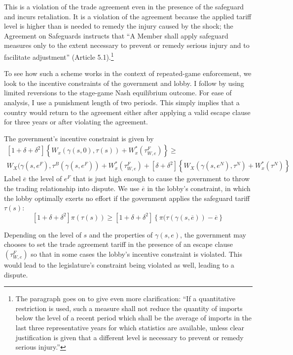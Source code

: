 \documentclass[12pt]{article}
\newcommand{\ov}{\overline}
\newcommand{\ga}{\gamma}
\newcommand{\de}{\delta}
\begin{document}
This is a violation of the trade agreement even in the presence of the safeguard and incurs retaliation. It is a violation of the agreement because the applied tariff level is higher than is needed to remedy the injury caused by the shock; the Agreement on Safeguards instructs that ``A Member shall apply safeguard measures only to the extent necessary to prevent or remedy serious injury and to facilitate adjustment'' (Article 5.1).\footnote{The paragraph goes on to give even more clarification: ``If a quantitative restriction is used, such a measure shall  not reduce the quantity of imports below the level of a recent period which shall be the average of imports in the last three representative years for which statistics are available, unless clear justification is given that a different level is necessary to prevent or remedy serious injury.''}

To see how such a scheme works in the context of repeated-game enforcement, we look to the incentive constraints of the government and lobby. I follow \Textcite{buzard2013a} by using limited reversions to the stage-game Nash equilibrium outcome. For ease of analysis, I use a punishment length of two periods. This simply implies that a country would return to the agreement either after applying a valid escape clause for three years or after violating the agreement.

The government's incentive constraint is given by
  \begin{multline}
    \left[1+ \de +\de^2 \right] \left\{W_x(\ga(s,0),\tau(s)) + W_x^*(\tau^F_{W,e}) \right\} \geq \\ W_X(\ga(s,e^F),\tau^B(\ga(s,e^F)) + W_x^*(\tau^F_{W,e}) + \left[\de +\de^2 \right] \left\{W_X(\ga(s,e^N),\tau^N) + W_x^*(\tau^N) \right\}
		\label{exp:govincentEC}
  \end{multline}
Label $\ov{e}$ the level of $e^F$ that is just high enough to cause the government to throw the trading relationship into dispute. We use $\ov{e}$ in the lobby's constraint, in which the lobby optimally exerts no effort if the government applies the safeguard tariff $\tau(s)$:
\begin{equation}
  \left[1+ \de +\de^2 \right] \pi(\tau(s)) \geq \left[1+ \de +\de^2 \right] \left\{\pi(\tau(\ga(s,\ov{e})) - \ov{e} \right\}
	\label{exp:lobbyEC}
\end{equation}

Depending on the level of $s$ and the properties of $\ga(s,e)$, the government may chooses to set the trade agreement tariff in the presence of an escape clause $\left(\tau^F_{W,e}\right)$ so that in some cases the lobby's incentive constraint is violated. This would lead to the legislature's constraint being violated as well, leading to a dispute. 
\end{document}

